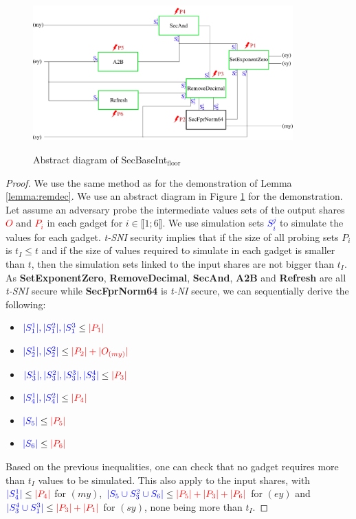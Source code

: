 \documentclass[runningheads]{llncs}
\begin{document}
\begin{figure}[!ht]
  \centering
  \includegraphics[width=10cm]{figure/secbaseint2.pdf}
  \label{fig:secbaseint}
  \caption{Abstract diagram of SecBaseInt$_\text{floor}$}
\end{figure}
\begin{proof}
  We use the same method as for the demonstration of Lemma \ref{lemma:remdec}. We use an abstract diagram in Figure \ref{fig:secbaseint} for the demonstration. Let assume an adversary probe the intermediate values sets of the output shares \textcolor{red}{$O$} and \textcolor{red}{$P_i$} in each gadget for $i\in\llbracket 1;6 \rrbracket$. We use simulation sets \textcolor{blue}{$S_i^j$} to simulate the values for each gadget. \emph{t-SNI} security implies that if the size of all probing sets $P_i$ is $t_I\leq t$ and if the size of values required to simulate in each gadget is smaller than $t$, then the simulation sets linked to the input shares are not bigger than $t_I$. As \textbf{SetExponentZero}, \textbf{RemoveDecimal}, \textbf{SecAnd}, \textbf{A2B} and \textbf{Refresh} are all \emph{t-SNI} secure while \textbf{SecFprNorm64} is \emph{t-NI} secure, we can sequentially derive the following:
  \begin{multicols}{2}
    \begin{itemize}
      \item $\textcolor{blue}{|S_1^1|,|S_1^2|,|S_1^3} \leq \textcolor{red}{|P_1|}$
      \item $\textcolor{blue}{|S_2^1|,|S_2^2|} \leq \textcolor{red}{|P_2| +|O_{(my)}|} $
      \item $\textcolor{blue}{|S_3^1|,|S_3^2|,|S_3^3|,|S_3^4|} \leq \textcolor{red}{|P_3|}$
      \item $\textcolor{blue}{|S_4^1|,|S_4^2|} \leq \textcolor{red}{|P_4|}$
      \item $\textcolor{blue}{|S_5|} \leq \textcolor{red}{|P_5|}$
      \item $\textcolor{blue}{|S_6|} \leq \textcolor{red}{|P_6|}$
    \end{itemize}
  \end{multicols}
  Based on the previous inequalities, one can check that no gadget requires more than $t_I$ values to be simulated. This also apply to the input shares, with $\textcolor{blue}{|S_{4}^1|}\leq\textcolor{red}{|P_4|}$ for $(my)$, $\textcolor{blue}{|S_5 \cup S_3^2\cup S_6|}\leq\textcolor{red}{|P_5|+|P_3| + |P_6|}$ for $(ey)$ and $\textcolor{blue}{|S_3^4\cup S_1^3|}\leq\textcolor{red}{|P_3|+|P_1|}$ for $(sy)$, none being more than $t_I$.
\end{proof}
\end{document}
